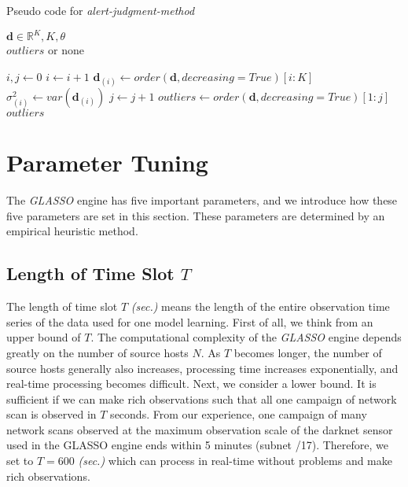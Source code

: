 \documentclass[conference]{IEEEtran}
\begin{document}
\begin{algorithm}[tb]
\caption{Pseudo code for {\it alert-judgment-method}}
\label{alg2}
\begin{algorithmic}[1]
  \REQUIRE $\bm{d}\in\mathbb{R}^{K}, K, \theta$\\
  \ENSURE $outliers$ or none

  \STATE $i, j \gets 0$
    \STATE $i \gets i + 1$
    \STATE $\bm{d}_{(i)} \gets order(\bm{d}, decreasing=True)[i:K]$
    \STATE $\sigma_{(i)}^2 \gets var(\bm{d}_{(i)})$
      \STATE $j \gets j + 1$
    \ELSE
      \STATE $outliers \gets order(\bm{d}, decreasing=True)[1:j]$
      \RETURN $outliers$
    \ENDIF
  \ENDWHILE
\end{algorithmic}
\end{algorithm}


\section{Parameter Tuning}
The {\it GLASSO} engine has five important parameters, and we introduce how these five parameters are set in this section.
These parameters are determined by an empirical heuristic method.


\subsection{Length of Time Slot $T$}
The length of time slot $T$ {\it (sec.)} means the length of the entire observation time series of the data used for one model learning.
First of all, we think from an upper bound of $T$.
The computational complexity of the {\it GLASSO} engine depends greatly on the number of source hosts $N$.
As $T$ becomes longer, the number of source hosts generally also increases, processing time increases exponentially, and real-time processing becomes difficult.
Next, we consider a lower bound.
It is sufficient if we can make rich observations such that all one campaign of network scan is observed in $T$ seconds.
From our experience, one campaign of many network scans observed at the maximum observation scale of the darknet sensor used in the GLASSO engine ends within 5 minutes (subnet /17).
Therefore, we set to $T=600$ {\it (sec.)} which can process in real-time without problems and make rich observations.
\end{document}
